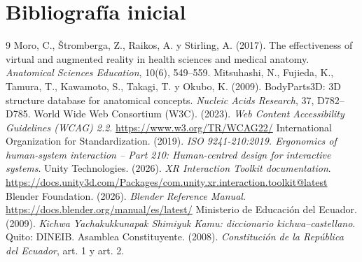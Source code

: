 \documentclass[11pt,a4paper]{article}
\begin{document}
\section{Bibliografía inicial}
\begingroup
\renewcommand{\section}[2]{}
\begin{thebibliography}{9}
 Moro, C., Štromberga, Z., Raikos, A. y Stirling, A. (2017). The effectiveness of virtual and augmented reality in health sciences and medical anatomy. \emph{Anatomical Sciences Education}, 10(6), 549--559.
 Mitsuhashi, N., Fujieda, K., Tamura, T., Kawamoto, S., Takagi, T. y Okubo, K. (2009). BodyParts3D: 3D structure database for anatomical concepts. \emph{Nucleic Acids Research}, 37, D782--D785.
 World Wide Web Consortium (W3C). (2023). \emph{Web Content Accessibility Guidelines (WCAG) 2.2}. \url{https://www.w3.org/TR/WCAG22/}
 International Organization for Standardization. (2019). \emph{ISO 9241-210:2019. Ergonomics of human-system interaction -- Part 210: Human-centred design for interactive systems}.
 Unity Technologies. (2026). \emph{XR Interaction Toolkit documentation}. \url{https://docs.unity3d.com/Packages/com.unity.xr.interaction.toolkit@latest}
 Blender Foundation. (2026). \emph{Blender Reference Manual}. \url{https://docs.blender.org/manual/es/latest/}
 Ministerio de Educación del Ecuador. (2009). \emph{Kichwa Yachakukkunapak Shimiyuk Kamu: diccionario kichwa--castellano}. Quito: DINEIB.
 Asamblea Constituyente. (2008). \emph{Constitución de la República del Ecuador}, art. 1 y art. 2.
\end{thebibliography}
\endgroup
\end{document}
